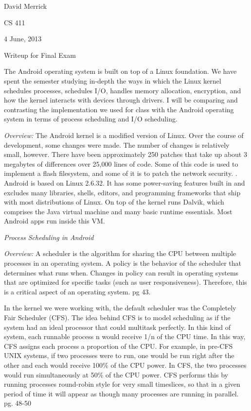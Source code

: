 \documentclass[letterpaper,10pt,titlepage]{article}
\newcommand{\tab}{\hspace*{2em}} %
\def\name{David Merrick}
\def\project{Final Exam}
\def\date{4 June, 2013}
\begin{document}
\name

CS 411

\date

\begin{center}
{\LARGE Writeup for \project}
\end{center}

\tab The Android operating system is built on top of a Linux foundation. We have spent the semester studying in-depth the ways in which the Linux kernel schedules processes, schedules I/O, handles memory allocation, encryption, and how the kernel interacts with devices through drivers. I will be comparing and contrasting the implementation we used for class with the Android operating system in terms of process scheduling and I/O scheduling.

\tab \emph{Overview:} The Android kernel is a modified version of Linux. Over the course of development, some changes were made. The number of changes is relatively small, however. There have been approximately 250 patches that take up about 3 megabytes of differences over 25,000 lines of code. Some of this code is used to implement a flash filesystem, and some of it is to patch the network security. \cite{features}. Android is based on Linux 2.6.32. It has some power-saving features built in and excludes many libraries, shells, editors, and programming frameworks that ship with most distributions of Linux. On top of the kernel runs Dalvik, which comprises the Java virtual machine and many basic runtime essentials. Most Android apps run inside this VM. \cite{Bray}

\emph{Process Scheduling in Android}

\tab \emph{Overview:} A scheduler is the algorithm for sharing the CPU between multiple processes in an operating system. A policy is the behavior of the scheduler that determines what runs when. Changes in policy can result in operating systems that are optimized for specific tasks (such as user responsiveness). Therefore, this is a critical aspect of an operating system. \cite{Love} pg 43. 

In the kernel we were working with, the default scheduler was the Completely Fair Scheduler (CFS). The idea behind CFS is to model scheduling as if the system had an ideal processor that could multitask perfectly. In this kind of system, each runnable process n would receive 1/n of the CPU time. In this way, CFS assigns each process a proportion of the CPU. For example, in pre-CFS UNIX systems, if two processes were to run, one would be run right after the other and each would receive 100\% of the CPU power. In CFS, the two processes would run simultaneously at 50\% of the CPU power. CFS performs this by running processes round-robin style for very small timeslices, so that in a given period of time it will appear as though many processes are running in parallel. \cite{Love} pg. 48-50
\end{document}
